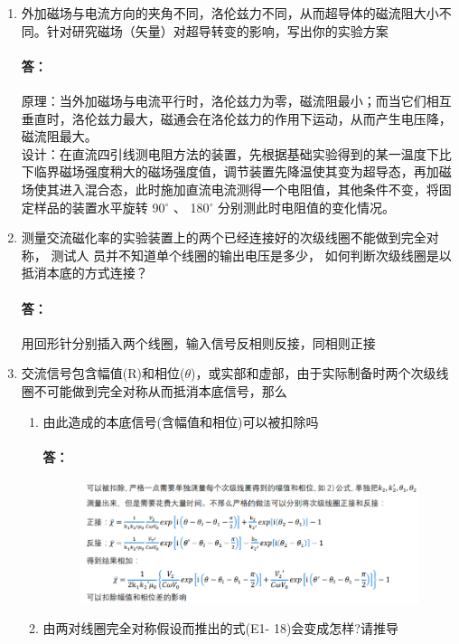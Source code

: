 \documentclass{ctexart}                                     %
\theoremstyle{ansstyle}
\begin{document}
\begin{enumerate}

    \item 外加磁场与电流方向的夹角不同，洛伦兹力不同，从而超导体的磁流阻大小不同。针对研究磁场（矢量）对超导转变的影响，写出你的实验方案
          \paragraph{答：}原理：当外加磁场与电流平行时，洛伦兹力为零，磁流阻最小；而当它们相互垂直时，洛伦兹力最大，磁通会在洛伦兹力的作用下运动，从而产生电压降，磁流阻最大。\\
          设计：在直流四引线测电阻方法的装置，先根据基础实验得到的某一温度下比下临界磁场强度稍大的磁场强度值，调节装置先降温使其变为超导态，再加磁场使其进入混合态，此时施加直流电流测得一个电阻值，其他条件不变，将固定样品的装置水平旋转 90$^\circ$ 、 180$^\circ$ 分别测此时电阻值的变化情况。
    \item 测量交流磁化率的实验装置上的两个已经连接好的次级线圈不能做到完全对称， 测试人
          员并不知道单个线圈的输出电压是多少， 如何判断次级线圈是以抵消本底的方式连接？
          \paragraph{答：}用回形针分别插入两个线圈，输入信号反相则反接，同相则正接
    \item 交流信号包含幅值(R)和相位($\theta$)，或实部和虚部，由于实际制备时两个次级线圈不可能做到完全对称从而抵消本底信号，那么
          \begin{enumerate}
              \item 由此造成的本底信号(含幅值和相位)可以被扣除吗
                    \paragraph{答：}\begin{figure}[H]
                        \includegraphics[width=0.8\linewidth]{./be/1}
                    \end{figure}
              \item 由两对线圈完全对称假设而推出的式(E1- 18)会变成怎样?请推导

\end{enumerate}
\end{enumerate}
\end{document}
